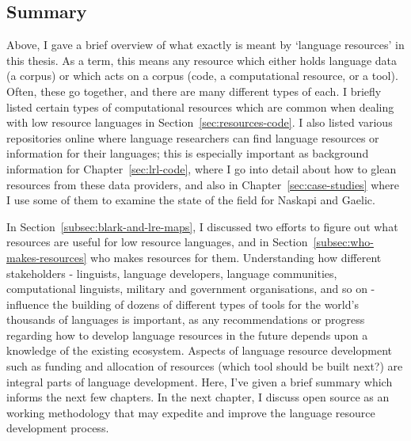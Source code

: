 \subsection{Summary}


Above, I gave a brief overview of what exactly is meant by `language resources' in this thesis. As a term, this means any resource which either holds language data (a corpus) or which acts on a corpus (code, a computational resource, or a tool). Often, these go together, and there are many different types of each. I briefly listed certain types of computational resources which are common when dealing with low resource languages in Section~\ref{sec:resources-code}. I also listed various repositories online where language researchers can find language resources or information for their languages; this is especially important as background information for Chapter~\ref{sec:lrl-code}, where I go into detail about how to glean resources from these data providers, and also in Chapter~\ref{sec:case-studies} where I use some of them to examine the state of the field for Naskapi and Gaelic.

In Section~\ref{subsec:blark-and-lre-maps}, I discussed two efforts to figure out what resources are useful for low resource languages, and in Section~\ref{subsec:who-makes-resources} who makes resources for them. Understanding how different stakeholders - linguists, language developers, language communities, computational linguists, military and government organisations, and so on - influence the building of dozens of different types of tools for the world's thousands of languages is important, as any recommendations or progress regarding how to develop language resources in the future depends upon a knowledge of the existing ecosystem. Aspects of language resource development such as funding and allocation of resources (which tool should be built next?) are integral parts of language development. Here, I've given a brief summary which informs the next few chapters. In the next chapter, I discuss open source as an working methodology that may expedite and improve the language resource development process. 
